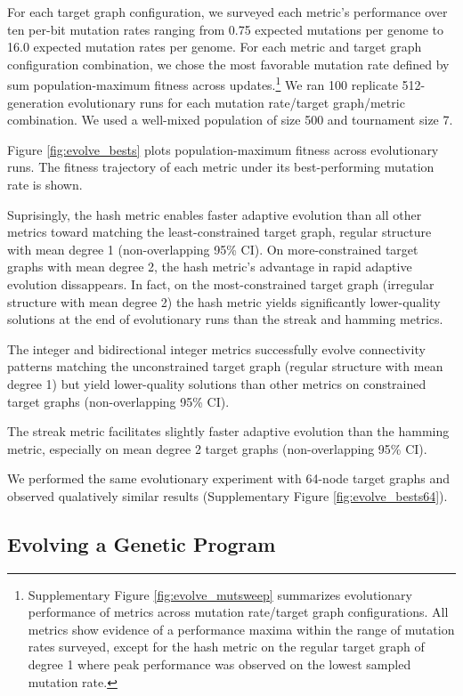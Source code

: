 For each target graph configuration, we surveyed each metric's performance over ten per-bit mutation rates ranging from 0.75 expected mutations per genome to 16.0 expected mutation rates per genome.
For each metric and target graph configuration combination, we chose the most favorable mutation rate defined by sum population-maximum fitness across updates.\footnote{
Supplementary Figure \ref{fig:evolve_mutsweep} summarizes evolutionary performance of metrics across mutation rate/target graph configurations.
All metrics show evidence of a performance maxima within the range of mutation rates surveyed, except for the hash metric on the regular target graph of degree 1 where peak performance was observed on the lowest sampled mutation rate.
}
We ran 100 replicate 512-generation evolutionary runs for each mutation rate/target graph/metric combination.
We used a well-mixed population of size 500 and tournament size 7.



Figure \ref{fig:evolve_bests} plots population-maximum fitness across evolutionary runs.
The fitness trajectory of each metric under its best-performing mutation rate is shown.

Suprisingly, the hash metric enables faster adaptive evolution than all other metrics toward matching the least-constrained target graph, regular structure with mean degree 1 (non-overlapping 95\% CI).
On more-constrained target graphs with mean degree 2, the hash metric's advantage in rapid adaptive evolution dissappears.
In fact, on the most-constrained target graph (irregular structure with mean degree 2) the hash metric yields significantly lower-quality solutions at the end of evolutionary runs than the streak and hamming metrics.

The integer and bidirectional integer metrics successfully evolve connectivity patterns matching the unconstrained target graph (regular structure with mean degree 1) but yield lower-quality solutions than other metrics on constrained target graphs (non-overlapping 95\% CI).

The streak metric facilitates slightly faster adaptive evolution than the hamming metric, especially on mean degree 2 target graphs (non-overlapping 95\% CI).

We performed the same evolutionary experiment with 64-node target graphs and observed qualatively similar results (Supplementary Figure \ref{fig:evolve_bests64}).

\subsection{Evolving a Genetic Program}

